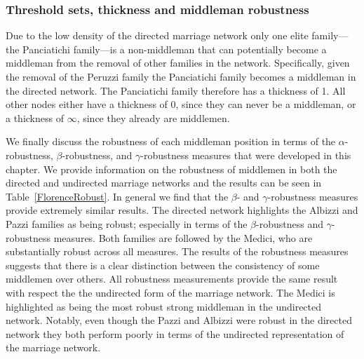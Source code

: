 \subsubsection{Threshold sets, thickness and middleman robustness}

Due to the low density of the directed marriage network only one elite family---the Panciatichi family---is a non-middleman that can potentially become a middleman from the removal of other families in the network. Specifically, given the removal of the Peruzzi family the Panciatichi family becomes a middleman in the directed network. The Panciatichi family therefore has a thickness of 1. All other nodes either have a thickness of 0, since they can never be a middleman, or a thickness of $\infty$, since they already are middlemen.

We finally discuss the robustness of each middleman position in terms of the $\alpha$-robustness, $\beta$-robustness, and $\gamma$-robustness measures that were developed in this chapter. We provide information on the robustness of middlemen in both the directed and undirected marriage networks and the results can be seen in Table~\ref{FlorenceRobust}. In general we find that the $\beta$- and $\gamma$-robustness measures provide extremely similar results. The directed network highlights the Albizzi and Pazzi families as being robust; especially in terms of the $\beta$-robustness and $\gamma$-robustness measures. Both families are followed by the Medici, who are substantially robust across all measures. The results of the robustness measures suggests that there is a clear distinction between the consistency of some middlemen over others. All robustness measurements provide the same result with respect the the undirected form of the marriage network. The Medici is highlighted as being the most robust strong middleman in the undirected network. Notably, even though the Pazzi and Albizzi were robust in the directed network they both perform poorly in terms of the undirected representation of the marriage network.

